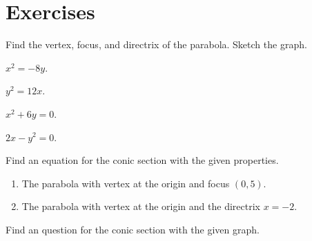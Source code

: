 \newpage

\section*{Exercises}

\begin{exercise}
  Find the vertex, focus, and directrix of the parabola. Sketch the graph.\\
  \begin{enumerate*}
      \item $x^2=-8y$.
      \item $y^2=12x$.
      \item $x^2+6y=0$.
      \item $2x-y^2=0$.
  \end{enumerate*}
\end{exercise}

\begin{exercise}
  Find an equation for the conic section with the given properties.
  \begin{enumerate}
      \item The parabola with vertex at the origin and focus $(0, 5)$.
      \item The parabola with vertex at the origin and the directrix $x=-2$.
  \end{enumerate}
  \end{exercise}

  \newpage

\begin{exercise}
    Find an question for the conic section with the given graph.\\
\end{exercise}

\newpage


